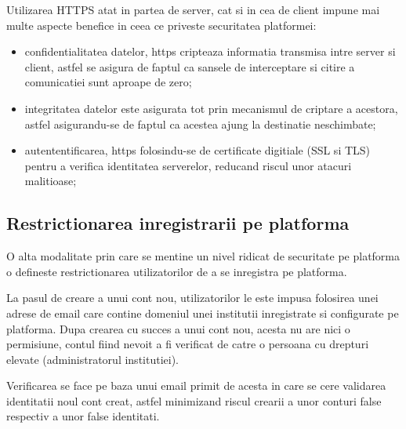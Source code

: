 Utilizarea HTTPS atat in partea de server, cat si in cea de client impune mai multe aspecte benefice in ceea ce priveste securitatea platformei:

\begin{itemize}
	
	\item confidentialitatea datelor, https cripteaza informatia transmisa intre server si client, astfel se asigura de faptul ca sansele de interceptare si citire a  comunicatiei sunt aproape de zero;
	
	\item integritatea datelor este asigurata tot prin mecanismul de criptare a acestora, astfel asigurandu-se de faptul ca acestea ajung la destinatie neschimbate;
	
	\item autententificarea, https folosindu-se de certificate digitiale (SSL si TLS) pentru a verifica identitatea serverelor, reducand riscul unor atacuri malitioase; 
	
\end{itemize}


\subsection*{Restrictionarea inregistrarii pe platforma}

O alta modalitate prin care se mentine un nivel ridicat de securitate pe platforma o defineste restrictionarea utilizatorilor de a se inregistra pe platforma.

La pasul de creare a unui cont nou, utilizatorilor le este  impusa folosirea unei adrese de email care contine domeniul unei institutii inregistrate si configurate pe platforma. Dupa crearea cu succes a unui cont nou, acesta nu are nici o permisiune, contul fiind nevoit a fi verificat de catre o persoana cu drepturi elevate (administratorul institutiei).

Verificarea se face pe baza unui email primit de acesta in care se cere validarea identitatii noul cont creat, astfel minimizand riscul crearii a unor conturi false respectiv a unor false identitati.

\newpage
